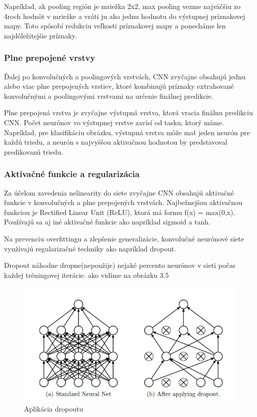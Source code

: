 Napríklad, ak pooling región je mriežka 2x2, max pooling vezme najväčšiu zo 4roch hodnôt v mriežke a vráti ju ako jednu hodnotu do výstupnej príznakovej mapy. Toto spôsobí redukciu veľkosti príznakovej mapy a ponecháme len najdôležitejšie príznaky. 

\subsubsection{Plne prepojené vrstvy}
\hspace{\parindent} Ďalej po konvolučných a poolingových vrstvách, CNN zvyčajne obsahujú jednu alebo viac plne prepojených vrstiev, ktoré kombinujú príznaky extrahované konvolučnými a poolingovými vrstvami na určenie finálnej predikcie. 

Plne prepojená vrstva je zvyčajne výstupná vrstva, ktorá vracia finálnu predikciu CNN. Počet neurónov vo výstupnej vrstve zavisí od tasku, ktorý máme. Napríklad, pre klasifikáciu obrázku, výstupná vrstva môže mať jeden neurón pre každú triedu, a neurón s najvyššou aktivačnou hodnotou by predstavoval predikovanú triedu. 

\subsubsection{Aktivačné funkcie a regularizácia}
\hspace{\parindent}Za účelom zavedenia nelinearity do siete zvyčajne CNN obsahujú aktivačné funkcie v konvolučných a plne prepojených vrstvách. Najbežnejšou aktivačnou funkciou je Rectified Linear Unit (ReLU), ktorá má formu f(x) = max(0,x). Používajú sa aj iné aktivačné funkcie ako napríklad sigmoid a tanh. 

Na prevenciu overfittingu a zlepšenie generalizácie, konvolučné neurónové siete využívajú regularizačné techniky ako napríklad dropout. 

Dropout náhodne dropne(nepoužije) nejaké percento neurónov v sieti počas každej tréningovej iterácie. ako vidíme na obrázku 3.5

\begin{figure}[!hbt]
\includegraphics[width=\textwidth]{images/dropout.png}
\centering
\caption{Aplikácia dropoutu}
\label{fig:image}
\end{figure}

